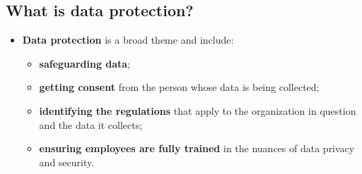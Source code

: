 \documentclass[9pt, letterpaper]{article}
\begin{document}
\subsection{What is data protection?}
\begin{itemize}
	\item \textbf{Data protection} is a broad theme and include:
	\begin{itemize}
		\item \textbf{safeguarding data};
		\item \textbf{getting consent} from the person whose data is being collected;
		\item \textbf{identifying the regulations} that apply to the organization in question and the data it collects;
		\item \textbf{ensuring employees are fully trained} in the nuances of data privacy and security.
	\end{itemize}
\end{itemize}
\end{document}
